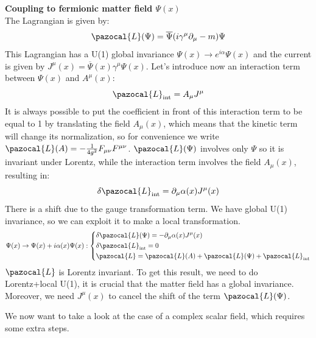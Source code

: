 \documentclass[../main.tex]{subfiles}
\begin{document}
\begin{example}
\textbf{Coupling to fermionic matter field $\Psi(x)$}\\
The Lagrangian is given by:
\[
\pazocal{L}(\Psi)=\overline{\Psi}(i\gamma^\mu\partial_\mu-m)\Psi
\]
This Lagrangian has a U(1) global invariance $\Psi(x)\to e^{i\alpha}\Psi(x)$ and the current is given by $J^\mu(x)=\overline{\Psi}(x)\gamma^\mu\Psi(x)$. Let's introduce now an interaction term between $\Psi(x)$ and $A^\mu(x)$:
\[
\pazocal{L}_{\text{int}}=A_\mu J^\mu
\]
It is always possible to put the coefficient in front of this interaction term to be equal to 1 by translating the field $A_\mu(x)$, which means that the kinetic term will change its normalization, so for convenience we write $\pazocal{L}(A)=-\frac{1}{4g^2}F_{\mu\nu}F^{\mu\nu}$. $\pazocal{L}(\Psi)$ involves only $\Psi$ so it is invariant under Lorentz, while the interaction term involves the field $A_\mu(x)$, resulting in:
\[
\delta\pazocal{L}_{\text{int}}=\partial_\mu\alpha(x)J^\mu(x)
\]
There is a shift due to the gauge transformation term. We have global U(1) invariance, so we can exploit it to make a local transformation.
\[
\Psi(x)\to\Psi(x)+i\alpha(x)\Psi(x):\left\{
\begin{aligned}
&\delta\pazocal{L}(\Psi)=-\partial_\mu\alpha(x)J^\mu(x)\\
&\delta\pazocal{L}_{\text{int}}=0\\
&\pazocal{L}=\pazocal{L}(A)+\pazocal{L}(\Psi)+\pazocal{L}_{\text{int}} 
\end{aligned}
\right.
\]
$\pazocal{L}$ is Lorentz invariant. To get this result, we need to do Lorentz+local U(1), it is crucial that the matter field has a global invariance. Moreover, we need $J^\mu(x)$ to cancel the shift of the term $\pazocal{L}(\Psi)$.
\end{example}
We now want to take a look at the case of a complex scalar field, which requires some extra steps.
\end{document}
